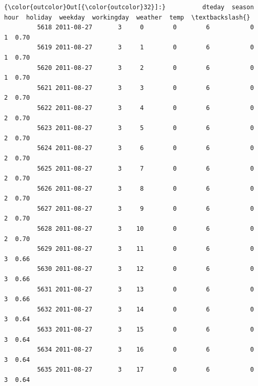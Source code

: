 \documentclass[11pt]{article}
\begin{document}
\begin{Verbatim}[commandchars=\\\{\}]
{\color{outcolor}Out[{\color{outcolor}32}]:}          dteday  season  hour  holiday  weekday  workingday  weather  temp  \textbackslash{}
         5618 2011-08-27       3     0        0        6           0        1  0.70   
         5619 2011-08-27       3     1        0        6           0        1  0.70   
         5620 2011-08-27       3     2        0        6           0        1  0.70   
         5621 2011-08-27       3     3        0        6           0        2  0.70   
         5622 2011-08-27       3     4        0        6           0        2  0.70   
         5623 2011-08-27       3     5        0        6           0        2  0.70   
         5624 2011-08-27       3     6        0        6           0        2  0.70   
         5625 2011-08-27       3     7        0        6           0        2  0.70   
         5626 2011-08-27       3     8        0        6           0        2  0.70   
         5627 2011-08-27       3     9        0        6           0        2  0.70   
         5628 2011-08-27       3    10        0        6           0        2  0.70   
         5629 2011-08-27       3    11        0        6           0        3  0.66   
         5630 2011-08-27       3    12        0        6           0        3  0.66   
         5631 2011-08-27       3    13        0        6           0        3  0.66   
         5632 2011-08-27       3    14        0        6           0        3  0.64   
         5633 2011-08-27       3    15        0        6           0        3  0.64   
         5634 2011-08-27       3    16        0        6           0        3  0.64   
         5635 2011-08-27       3    17        0        6           0        3  0.64   
         

\end{Verbatim}
\end{document}
